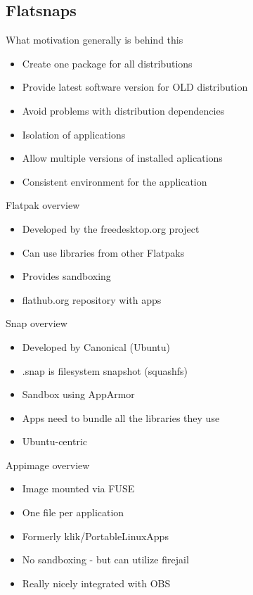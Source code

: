 \documentclass{beamer}
\begin{document}
\subsection{Flatsnaps}

\begin{frame}[t]{What motivation generally is behind this}
	\begin{itemize}
	\item Create one package for all distributions
	\item Provide latest software version for OLD distribution
	\item Avoid problems with distribution dependencies
	\item Isolation of applications
	\item Allow multiple versions of installed aplications
	\item Consistent environment for the application
	\end{itemize}
\end{frame}

\begin{frame}[t]{Flatpak overview}
	\begin{itemize}
	\item Developed by the freedesktop.org project
	\item Can use libraries from other Flatpaks
	\item Provides sandboxing
	\item flathub.org repository with apps
	\end{itemize}
\end{frame}

\begin{frame}[t]{Snap overview}
	\begin{itemize}
	\item Developed by Canonical (Ubuntu)
	\item .snap is filesystem snapshot (squashfs)
	\item Sandbox using AppArmor
	\item Apps need to bundle all the libraries they use
	\item Ubuntu-centric
	\end{itemize}
\end{frame}

\begin{frame}[t]{Appimage overview}
	\begin{itemize}
	\item Image mounted via FUSE
	\item One file per application
	\item Formerly klik/PortableLinuxApps
	\item No sandboxing - but can utilize firejail
	\item Really nicely integrated with OBS
	\end{itemize}
\end{frame}
\end{document}
